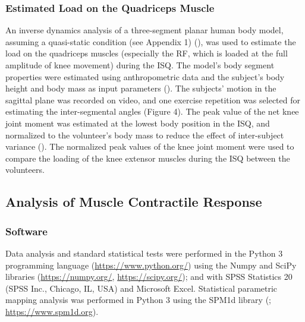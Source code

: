 \documentclass[utf8]{FrontiersinHarvard}
\begin{document}
\subsubsection{Estimated Load on the Quadriceps Muscle}
An inverse dynamics analysis of a three-segment planar human body model, assuming a quasi-static condition (see Appendix 1) (\cite{yoshioka, fry, hof}), was used to estimate the load on the quadriceps muscles (especially the RF, which is loaded at the full amplitude of knee movement) during the ISQ.
The model's body segment properties were estimated using anthropometric data and the subject’s body height and body mass as input parameters (\cite{winter}).
The subjects' motion in the sagittal plane was recorded on video, and one exercise repetition was selected for estimating the inter-segmental angles (Figure 4).
The peak value of the net knee joint moment was estimated at the lowest body position in the ISQ,
and normalized to the volunteer’s body mass to reduce the effect of inter-subject variance (\cite{wannop, moiso}).
The normalized peak values of the knee joint moment were used to compare the loading of the knee extensor muscles during the ISQ between the volunteers.

\subsection{Analysis of Muscle Contractile Response} \label{ss:analysis}

\subsubsection{Software}
Data analysis and standard statistical tests were performed in the Python 3 programming language (\url{https://www.python.org/}) using the Numpy and SciPy libraries (\url{https://numpy.org/}, \url{https://scipy.org/});
and with SPSS Statistics 20 (SPSS Inc., Chicago, IL, USA) and Microsoft Excel.
Statistical parametric mapping analysis was performed in Python 3 using the SPM1d library (\cite{pataky-spm1d}; \url{https://www.spm1d.org}).
\end{document}
